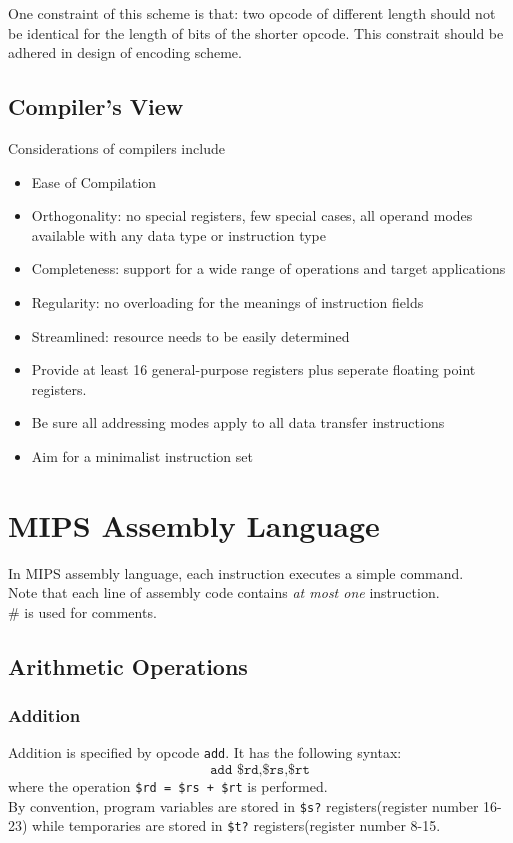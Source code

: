 \documentclass[12pt]{article}
\theoremstyle{definition}
\begin{document}
One constraint of this scheme is that: two opcode of different length should not be identical for the length of bits of the shorter opcode. This constrait should be adhered in design of encoding scheme.
\subsection{Compiler's View}
Considerations of compilers include
\begin{itemize}
  \item Ease of Compilation
  \item Orthogonality: no special registers, few special cases, all operand modes available with any data type or instruction type
  \item Completeness: support for a wide range of operations and target applications
  \item Regularity: no overloading for the meanings of instruction fields
  \item Streamlined: resource needs to be easily determined
  \item Provide at least 16 general-purpose registers plus seperate floating point registers.
  \item Be sure all addressing modes apply to all data transfer instructions
  \item Aim for a minimalist instruction set
\end{itemize}
\clearpage
\section{MIPS Assembly Language}
In MIPS assembly language, each instruction executes a simple command.\\Note that each line of assembly code contains \textit{at most one} instruction.\\\# is used for comments. 
\subsection{Arithmetic Operations}
\subsubsection{Addition}
Addition is specified by opcode \texttt{add}. It has the following syntax:
\[
\texttt{add \$rd,\$rs,\$rt}
\]
where the operation \texttt{\$rd = \$rs + \$rt} is performed.\\
By convention, program variables are stored in \texttt{\$s?} registers(register number 16-23) while temporaries are stored in \texttt{\$t?} registers(register number 8-15.
\end{document}
